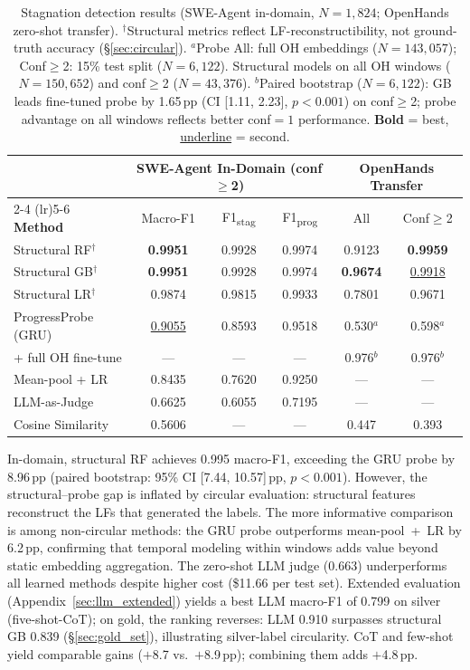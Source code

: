 \begin{table}[t]
\centering
\small
\begin{tabular}{l ccc cc}
\toprule
& \multicolumn{3}{c}{\textbf{SWE-Agent In-Domain} (conf${\geq}$2)} & \multicolumn{2}{c}{\textbf{OpenHands Transfer}} \\
\cmidrule(lr){2-4} \cmidrule(lr){5-6}
\textbf{Method} & Macro-F1 & F1\textsubscript{stag} & F1\textsubscript{prog} & All & Conf${\geq}$2 \\
\midrule
Structural RF$^\dagger$       & \textbf{0.9951} & 0.9928 & 0.9974 & 0.9123 & \textbf{0.9959} \\
Structural GB$^\dagger$       & \textbf{0.9951} & 0.9928 & 0.9974 & \textbf{0.9674} & \underline{0.9918} \\
Structural LR$^\dagger$       & 0.9874 & 0.9815 & 0.9933 & 0.7801 & 0.9671 \\
ProgressProbe (GRU)           & \underline{0.9055} & 0.8593 & 0.9518 & 0.530$^a$ & 0.598$^a$ \\
\quad + full OH fine-tune      & ---    & ---    & ---    & 0.976$^b$ & 0.976$^b$ \\
Mean-pool + LR                & 0.8435 & 0.7620 & 0.9250 & ---    & --- \\
LLM-as-Judge                  & 0.6625 & 0.6055 & 0.7195 & ---    & --- \\
Cosine Similarity             & 0.5606 & ---    & ---    & 0.447  & 0.393 \\
\bottomrule
\end{tabular}
\caption{Stagnation detection results (SWE-Agent in-domain, $N{=}1{,}824$; OpenHands zero-shot transfer). $^\dagger$Structural metrics reflect LF-reconstructibility, not ground-truth accuracy (\S\ref{sec:circular}). $^a$Probe All: full OH embeddings ($N{=}143{,}057$); Conf${\geq}$2: 15\% test split ($N{=}6{,}122$). Structural models on all OH windows ($N{=}150{,}652$) and conf${\geq}$2 ($N{=}43{,}376$). $^b$Paired bootstrap ($N{=}6{,}122$): GB leads fine-tuned probe by 1.65\,pp (CI [1.11, 2.23], $p{<}0.001$) on conf${\geq}$2; probe advantage on all windows reflects better conf${=}1$ performance. \textbf{Bold} = best, \underline{underline} = second.}
\label{tab:main_results}
\end{table}

In-domain, structural RF achieves 0.995 macro-F1, exceeding the GRU probe by 8.96\,pp (paired bootstrap: 95\% CI [7.44, 10.57]\,pp, $p{<}0.001$).
However, the structural--probe gap is inflated by circular evaluation: structural features reconstruct the LFs that generated the labels.
The more informative comparison is among non-circular methods: the GRU probe outperforms mean-pool~+~LR by 6.2\,pp, confirming that temporal modeling within windows adds value beyond static embedding aggregation.
The zero-shot LLM judge (0.663) underperforms all learned methods despite higher cost (\$11.66 per test set).
Extended evaluation (Appendix~\ref{sec:llm_extended}) yields a best LLM macro-F1 of 0.799 on silver (five-shot-CoT); on gold, the ranking reverses: LLM 0.910 surpasses structural GB 0.839 (\S\ref{sec:gold_set}), illustrating silver-label circularity.
CoT and few-shot yield comparable gains ($+$8.7 vs.\ $+$8.9\,pp); combining them adds $+$4.8\,pp.

